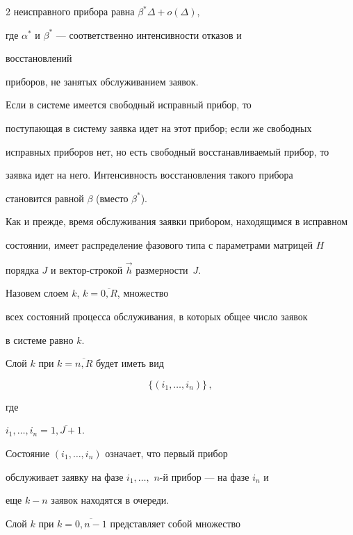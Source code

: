 \begin{multicols}{2}
неисправного прибора равна $\beta^* \Delta + o(\Delta)$,


где $\alpha^*$ и $\beta^*$ --- соответственно интенсивности отказов и


восстановлений


приборов, не занятых обслуживанием заявок.





Если в системе имеется свободный исправный прибор, то


поступающая в систему заявка идет на этот прибор; если же свободных


исправных приборов нет, но есть свободный восстанавливаемый прибор, то


заявка идет на него. Интенсивность восстановления такого прибора


становится равной $\beta$ (вместо $\beta^*$).





Как и прежде, время обслуживания заявки прибором, находящимся в исправном


состоянии, имеет распределение фазового типа с параметрами мат\-ри\-цей $H$


порядка $J$ и вектор-строкой $\vec h$ размерности~$J$.





Назовем слоем $k$, $k=\overline{0,R}$, множество


всех состояний процесса обслуживания, в которых общее число заявок


в системе равно $k$.





Слой $k$ при $k=\overline{n,R}$ будет иметь вид


$$


\{(i_1,\ldots,i_n)\}\,,


$$


где


$i_1,\ldots,i_n=\overline{1,J+1}$.


Состояние $(i_1,\ldots,i_n)$ означает, что первый прибор


обслуживает заявку на фазе $i_1,\ldots,$ $n$-й прибор --- на фазе $i_n$ и


еще $k-n$ заявок находятся в очереди.








Слой $k$ при $k=\overline{0,n-1}$ представляет собой множество



\end{multicols}
